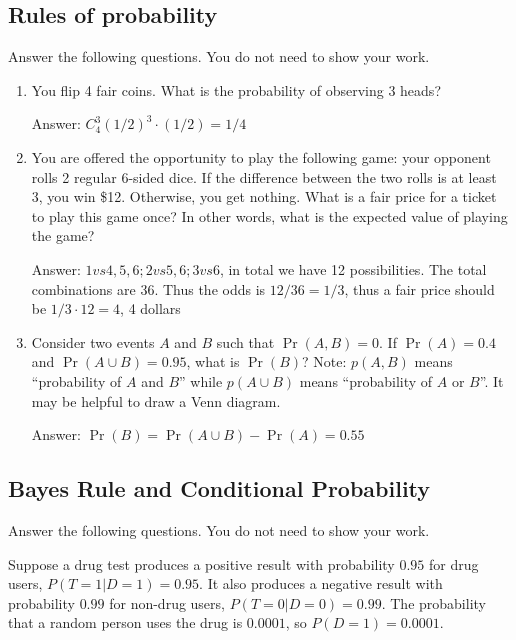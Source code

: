\documentclass{article}
\def\blu#1{{\color{blu}#1}}
\begin{document}
\subsection{Rules of probability}

\blu{Answer the following questions.} You do not need to show your work.

\begin{enumerate}
\item You flip 4 fair coins. What is the probability of observing 3 heads?

\blu{Answer:} $C^{3}_{4} (1/2)^3\cdot (1/2)=1/4$

\item You are offered the opportunity to play the following game: your opponent rolls 2 regular 6-sided dice. If the difference between the two rolls is at least 3, you win \$12. Otherwise, you get nothing. What is a fair price for a ticket to play this game once? In other words, what is the expected value of playing the game?


\blu{Answer:} $1 vs 4, 5, 6; 2 vs 5, 6; 3 vs 6$, in total we have 12 possibilities. The total combinations are 36. Thus the odds is $12/36=1/3$, thus a fair price should be $1/3\cdot 12=4$, 4 dollars
\item Consider two events $A$ and $B$ such that $\Pr(A, B)=0$. If $\Pr(A) = 0.4$ and $\Pr(A \cup B) = 0.95$, what is $\Pr(B)$? Note: $p(A, B)$ means
``probability of $A$ and $B$'' while $p(A \cup B)$ means ``probability of $A$ or $B$''. It may be helpful to draw a Venn diagram.

\blu{Answer:} $\Pr(B)=\Pr(A \cup B)-\Pr(A)=0.55$


\end{enumerate}

\subsection{Bayes Rule and Conditional Probability}

\blu{Answer the following questions.} You do not need to show your work.

Suppose a drug test produces a positive result with probability $0.95$ for drug users, $P(T=1|D=1)=0.95$. It also produces a negative result with probability $0.99$ for non-drug users, $P(T=0|D=0)=0.99$. The probability that a random person uses the drug is $0.0001$, so $P(D=1)=0.0001$. 
\end{document}
